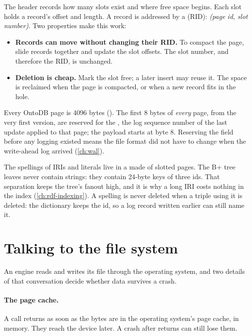 The header records how many slots exist and where free space begins. Each slot
holds a record's offset and length. A record is addressed by a 
(RID): \emph{(page id, slot number)}. Two properties make this work:

\begin{itemize}
\item \textbf{Records can move without changing their RID.} To compact the page, slide records together and update the slot offsets. The slot number, and therefore the RID, is unchanged.
\item \textbf{Deletion is cheap.} Mark the slot free; a later insert may reuse it. The space is reclaimed when the page is compacted, or when a new record fits in the hole.
\end{itemize}

\begin{ontodb}
Every OntoDB page is 4096 bytes (). The first 8 bytes of
\emph{every} page, from the very first version, are reserved for the
, the log sequence number of the last update applied to that
page; the payload starts at byte 8. Reserving the field before any logging
existed means the file format did not have to change when the write-ahead log
arrived (\cref{ch:wal}).

The spellings of IRIs and literals live in a  made of slotted
pages. The B+ tree leaves never contain strings: they contain 24-byte keys of
three ids. That separation keeps the tree's fanout high, and it is why a long
IRI costs nothing in the index (\cref{ch:rdf-indexing}). A spelling is never
deleted when a triple using it is deleted: the dictionary keeps the id, so a
log record written earlier can still name it.
\end{ontodb}

\section{Talking to the file system}

An engine reads and writes its file through the operating system, and two
details of that conversation decide whether data survives a crash.

\paragraph{The page cache.} A  call returns as soon as the bytes are
in the operating system's page cache, in memory. They reach the device later.
A crash after  returns can still lose them.

